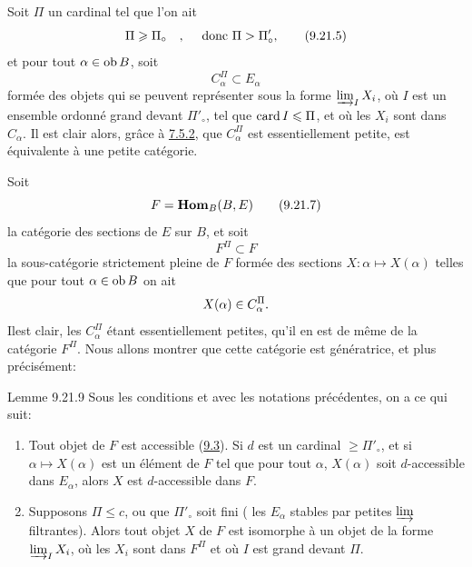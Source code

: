 \documentclass[10pt]{../fichiers-configuration-latex/smfart}
\def\labelenumi{(\theenumi)}
\begin{document}
Soit $\Pi$ un cardinal tel que l'on ait
\begin{equation}
\Pi\geqslant \Pi_\circ\quad,\quad\mbox{ donc }
\Pi>\Pi'_\circ{},\tag{9.21.5}
\end{equation}
et pour tout $\alpha\in \operatorname{ob} B$, soit
\begin{equation}
C^{\Pi}_{\alpha}\subset E_{\alpha}\tag{9.21.6}
\end{equation}
formée des objets qui se peuvent représenter sous la forme
$\varinjlim_I X_i$, où $I$ est un ensemble ordonné grand devant
$\Pi'_\circ$, tel que $\operatorname{card} I\leqslant \Pi$, et où les $X_i$ sont dans
$C_{\alpha}$. Il est clair alors, grâce à \hyperref[I.var7.5.2]{7.5.2}, que
$C^{\Pi}_{\alpha}$ est essentiellement petite, \ie est équivalente à
une petite catégorie.

Soit
\begin{equation}
F=\operatorname{\mathbf{Hom}}_B(B,E)\tag{9.21.7}
\end{equation}
la catégorie des sections de $E$ sur $B$, et soit
\begin{equation}
F^{\Pi}\subset F\tag{9.21.8}
\end{equation}
la sous-catégorie strictement pleine de $F$ formée des sections
$X:\alpha\mapsto X(\alpha)$ telles que pour tout $\alpha\in \operatorname{ob} B$
on ait
$$
X(\alpha)\in C^{\Pi}_{\alpha}{}.
$$
Il\pageoriginale est clair, les $C^{\Pi}_{\alpha}$ étant
essentiellement petites, qu'il en est de même de la catégorie
$F^{\Pi}$. Nous allons montrer que cette catégorie est génératrice,
et plus précisément:

\begin{enonce*}{Lemme 9.21.9}
Sous les conditions et avec les notations précédentes, on a ce qui
suit:
\begin{enumerate}
\renewcommand{\theenumi}{\roman{enumi}}
\renewcommand{\labelenumi}{(\theenumi)}
\item Tout objet de $F$ est accessible (\hyperref[I.def9.3]{9.3}). Si $d$ est un cardinal
$\geq \Pi'_\circ$, et si $\alpha\mapsto X(\alpha)$ est un élément de
$F$ tel que pour tout $\alpha$, $X(\alpha)$ soit $d$-accessible dans
$E_{\alpha}$, alors $X$ est $d$-accessible dans $F$.

\item Supposons $\Pi\leq c$, ou que $\Pi'_\circ$ soit fini (\ie
les $E_{\alpha}$ stables par petites $\varinjlim$ filtrantes). Alors
tout objet $X$ de $F$ est isomorphe à un objet de la forme
$\varinjlim_I X_i$, où les $X_i$ sont dans $F^{\Pi}$ et où $I$ est
grand devant $\Pi$.
\end{enumerate}
\end{enonce*}
\end{document}
